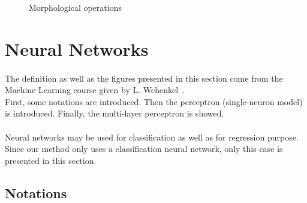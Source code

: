 \documentclass[a4paper,12pt]{article}
\begin{document}
\begin{figure}[H]
\caption{Morphological operations}
\label{morphIllustration}
\end{figure}

\newpage

\section{Neural Networks}
\label{sec:neuralNetworks}

\paragraph{}
The definition as well as the figures presented in this section come from the Machine Learning course given by L. Wehenkel~\cite{Wehenkel2005}. \\
First, some notations are introduced. Then the perceptron (single-neuron model) is introduced. Finally, the multi-layer perceptron is showed.

\paragraph{}
Neural networks may be used for classification as well as for regression purpose. Since our method only uses a classification neural network, only this case is presented in this section.

\subsection{Notations}
\end{document}

